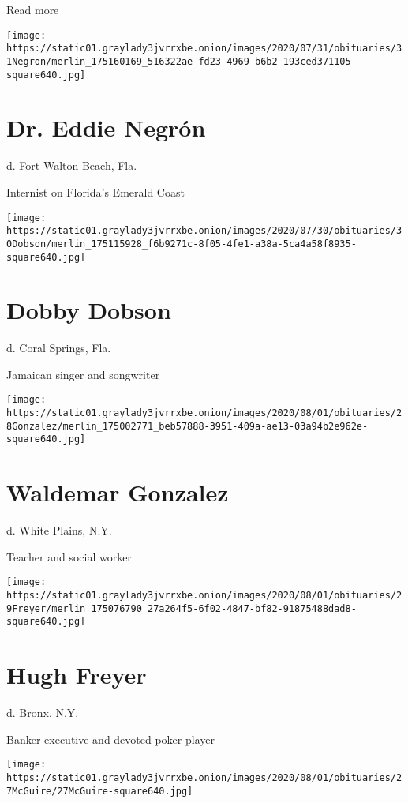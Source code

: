 Read more

\texttt{[image: https://static01.graylady3jvrrxbe.onion/images/2020/07/31/obituaries/31Negron/merlin\_175160169\_516322ae-fd23-4969-b6b2-193ced371105-square640.jpg]}

\hypertarget{dr-eddie-negruxf3n}{%
\section{Dr. Eddie Negrón}\label{dr-eddie-negruxf3n}}

d. Fort Walton Beach, Fla.

Internist on Florida's Emerald Coast

\texttt{[image: https://static01.graylady3jvrrxbe.onion/images/2020/07/30/obituaries/30Dobson/merlin\_175115928\_f6b9271c-8f05-4fe1-a38a-5ca4a58f8935-square640.jpg]}

\hypertarget{dobby-dobson}{%
\section{Dobby Dobson}\label{dobby-dobson}}

d. Coral Springs, Fla.

Jamaican singer and songwriter

\texttt{[image: https://static01.graylady3jvrrxbe.onion/images/2020/08/01/obituaries/28Gonzalez/merlin\_175002771\_beb57888-3951-409a-ae13-03a94b2e962e-square640.jpg]}

\hypertarget{waldemar-gonzalez}{%
\section{Waldemar Gonzalez}\label{waldemar-gonzalez}}

d. White Plains, N.Y.

Teacher and social worker

\texttt{[image: https://static01.graylady3jvrrxbe.onion/images/2020/08/01/obituaries/29Freyer/merlin\_175076790\_27a264f5-6f02-4847-bf82-91875488dad8-square640.jpg]}

\hypertarget{hugh-freyer}{%
\section{Hugh Freyer}\label{hugh-freyer}}

d. Bronx, N.Y.

Banker executive and devoted poker player

\texttt{[image: https://static01.graylady3jvrrxbe.onion/images/2020/08/01/obituaries/27McGuire/27McGuire-square640.jpg]}

